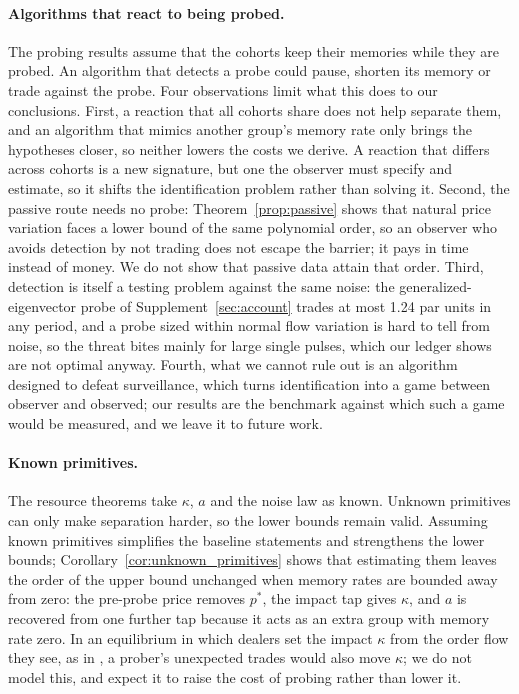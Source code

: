 \documentclass[12pt]{article}
\theoremstyle{definition}
\theoremstyle{remark}
\begin{document}
\paragraph{Algorithms that react to being probed.} The probing results assume that the cohorts keep their memories while they are probed. An algorithm that detects a probe could pause, shorten its memory or trade against the probe. Four observations limit what this does to our conclusions. First, a reaction that all cohorts share does not help separate them, and an algorithm that mimics another group's memory rate only brings the hypotheses closer, so neither lowers the costs we derive. A reaction that differs across cohorts is a new signature, but one the observer must specify and estimate, so it shifts the identification problem rather than solving it. Second, the passive route needs no probe: Theorem~\ref{prop:passive} shows that natural price variation faces a lower bound of the same polynomial order, so an observer who avoids detection by not trading does not escape the barrier; it pays in time instead of money. We do not show that passive data attain that order. Third, detection is itself a testing problem against the same noise: the generalized-eigenvector probe of Supplement~\ref{sec:account} trades at most 1.24 par units in any period, and a probe sized within normal flow variation is hard to tell from noise, so the threat bites mainly for large single pulses, which our ledger shows are not optimal anyway. Fourth, what we cannot rule out is an algorithm designed to defeat surveillance, which turns identification into a game between observer and observed; our results are the benchmark against which such a game would be measured, and we leave it to future work.

\paragraph{Known primitives.} The resource theorems take $\kappa$, $a$ and the noise law as known. Unknown primitives can only make separation harder, so the lower bounds remain valid. Assuming known primitives simplifies the baseline statements and strengthens the lower bounds; Corollary~\ref{cor:unknown_primitives} shows that estimating them leaves the order of the upper bound unchanged when memory rates are bounded away from zero: the pre-probe price removes $p^*$, the impact tap gives $\kappa$, and $a$ is recovered from one further tap because it acts as an extra group with memory rate zero. In an equilibrium in which dealers set the impact $\kappa$ from the order flow they see, as in \citet{kyle1985}, a prober's unexpected trades would also move $\kappa$; we do not model this, and expect it to raise the cost of probing rather than lower it.
\end{document}
